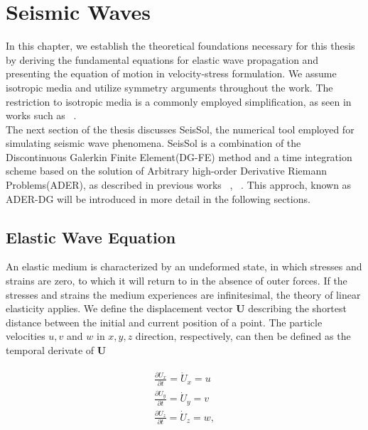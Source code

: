 
\chapter{Seismic Waves}\label{chapter:seismicwaves}
In this chapter, we establish the theoretical foundations necessary for this thesis by deriving the fundamental equations for elastic
wave propagation and presenting the equation of motion in velocity-stress formulation. We assume isotropic media and utilize symmetry arguments
throughout the work. The restriction to isotropic media is a commonly employed simplification, as seen in works such as ~\parencite{dumbser1}. \\

The next section of the thesis discusses SeisSol, the numerical tool employed for simulating seismic wave phenomena. SeisSol is a combination
of the Discontinuous Galerkin Finite Element(DG-FE) method and a time integration scheme based on the solution of Arbitrary high-order
Derivative Riemann Problems(ADER), as described in previous works ~\parencite{dumbser1}, ~\parencite{seissol}. This approch, known as 
ADER-DG will be introduced in more detail in the following sections.

\section{Elastic Wave Equation}
An elastic medium is characterized by an undeformed state, in which stresses and strains are zero, to which it will return to in the absence
of outer forces. If the stresses and strains the medium experiences are infinitesimal, the theory of linear elasticity applies. We define
the displacement vector $\mathbf{U}$ describing the shortest distance between the initial and current position of a point. The particle
velocities $u,v$ and $w$ in $x, y, z$ direction, respectively, can then be defined as the temporal derivate of $\mathbf{U}$

\begin{align}
    \begin{split}
    \frac{\partial U_x}{\partial t} = \dot{U}_x = u \\
    \frac{\partial U_y}{\partial t} = \dot{U}_y = v \\
    \frac{\partial U_z}{\partial t} = \dot{U}_z = w, \\
    \end{split}
 \end{align}

